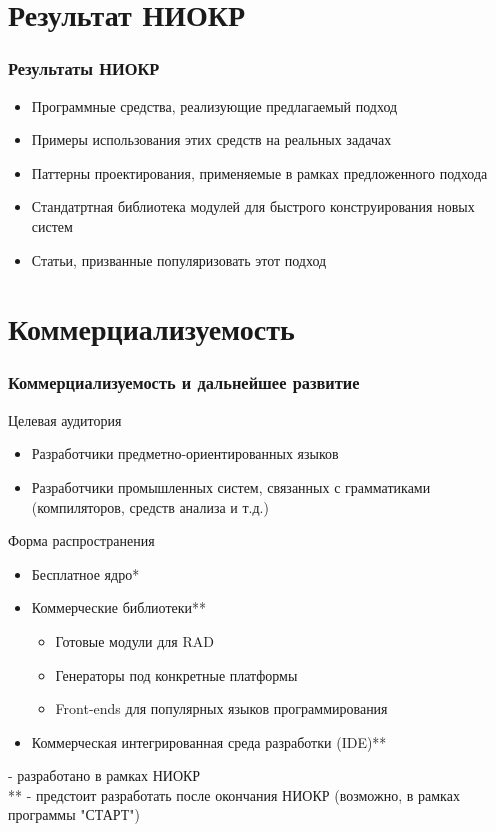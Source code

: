 \documentclass[paper=screen,10pt,unicode]{beamer}
\begin{document}
\section{Результат НИОКР}
\begin{frame}
	\frametitle{Результаты НИОКР}
	\begin{block}{}
		\begin{itemize}
			\item Программные средства, реализующие предлагаемый подход
			\item Примеры использования этих средств на реальных задачах
			\item Паттерны проектирования, применяемые в рамках предложенного подхода
			\item Стандатртная библиотека модулей для быстрого конструирования новых систем
			\item Статьи, призванные популяризовать этот подход
		\end{itemize}
	\end{block}
\end{frame}

\section{Коммерциализуемость}

\begin{frame}
	\frametitle{Коммерциализуемость и дальнейшее развитие}
	\begin{block}{Целевая аудитория}
		\begin{itemize}
			\item Разработчики предметно-ориентированных языков
			\item Разработчики промышленных систем, связанных с грамматиками (компиляторов, средств анализа и т.д.)
		\end{itemize}
	\end{block}
	\begin{block}{Форма распространения}
		\begin{itemize}
			\item Бесплатное ядро*
			\item Коммерческие библиотеки**
				\begin{itemize}
					\item Готовые модули для RAD
					\item Генераторы под конкретные платформы
					\item Front-ends для популярных языков программирования
				\end{itemize}
			\item Коммерческая интегрированная среда разработки (IDE)**
		\end{itemize}
		{\small * - разработано в рамках НИОКР\\
		** - предстоит разработать после окончания НИОКР (возможно, в рамках программы "СТАРТ")
		}
	\end{block}
\end{frame}
\end{document}
